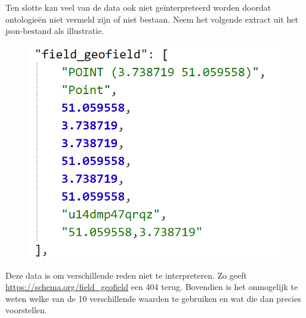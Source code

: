 \documentclass[11pt, letterpaper, oneside]{article}
\begin{document}
	\newpage
	
	Ten slotte kan veel van de data ook niet geïnterpreteerd worden doordat ontologieën niet vermeld zijn of niet bestaan. %
	Neem het volgende extract uit het json-bestand als illustratie.
	
	\begin{figure}[h]
		\centering
		\includegraphics[height=0.5\linewidth]{figuren/field_geofield}
	\end{figure}

	Deze data is om verschillende reden niet te interpreteren. Zo geeft \url{https://schema.org/field_geofield} een 404 terug. Bovendien is het  onmogelijk te weten welke van de 10 verschillende waarden te gebruiken en wat die dan precies voorstellen.
\end{document}
